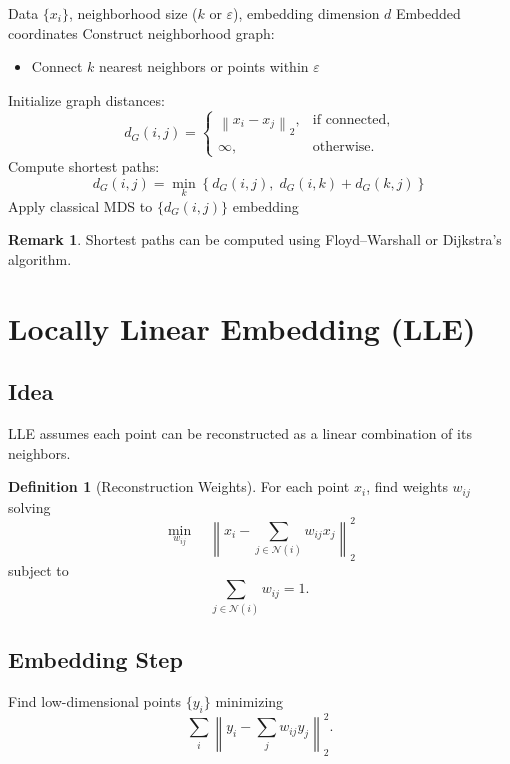 \documentclass[12pt,oneside]{book}
\numberwithin{equation}{section}
\theoremstyle{definition}
\newtheorem{definition}{Definition}[section]
\newtheorem{remark}{Remark}[section]
\theoremstyle{plain}
\theoremstyle{remark}
\newcommand{\norm}[1]{\left\lVert #1 \right\rVert}
\begin{document}
\begin{algorithm}[H]
\caption{Isomap}
\begin{algorithmic}[1]
\Require Data $\{x_i\}$, neighborhood size ($k$ or $\varepsilon$), embedding dimension $d$
\Ensure Embedded coordinates
\State Construct neighborhood graph:
\begin{itemize}
    \item Connect $k$ nearest neighbors or points within $\varepsilon$
\end{itemize}
\State Initialize graph distances:
\[
d_G(i,j) =
\begin{cases}
\norm{x_i - x_j}_2, & \text{if connected},\\
\infty, & \text{otherwise}.
\end{cases}
\]
\State Compute shortest paths:
\[
d_G(i,j) = \min_k \left\{ d_G(i,j), \; d_G(i,k) + d_G(k,j) \right\}
\]
\State Apply classical MDS to $\{d_G(i,j)\}$
\State \Return embedding
\end{algorithmic}
\end{algorithm}

\begin{remark}
Shortest paths can be computed using Floyd–Warshall or Dijkstra's algorithm.
\end{remark}

\section{Locally Linear Embedding (LLE)}

\subsection{Idea}

LLE assumes each point can be reconstructed as a linear combination of its neighbors.

\begin{definition}[Reconstruction Weights]
For each point $x_i$, find weights $w_{ij}$ solving
\[
\min_{w_{ij}}
\quad
\norm{x_i - \sum_{j \in \mathcal{N}(i)} w_{ij} x_j}_2^2
\]
subject to
\[
\sum_{j \in \mathcal{N}(i)} w_{ij} = 1.
\]
\end{definition}

\subsection{Embedding Step}

Find low-dimensional points $\{y_i\}$ minimizing
\[
\sum_i
\norm{y_i - \sum_j w_{ij} y_j}_2^2.
\]
\end{document}
